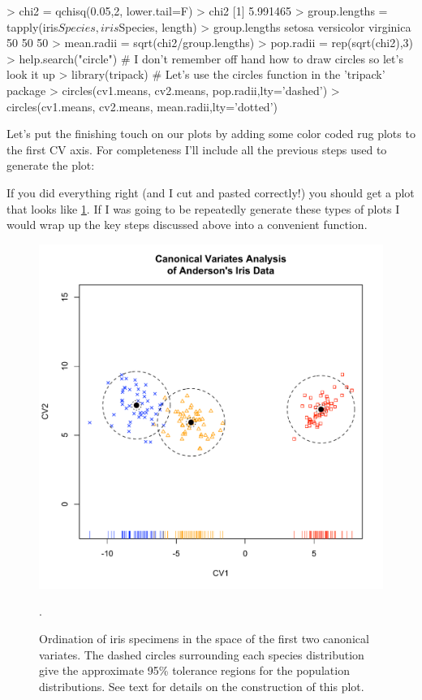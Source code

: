 \begin{R}
> chi2 = qchisq(0.05,2, lower.tail=F)
> chi2
[1] 5.991465
> group.lengths = tapply(iris$Species, iris$Species, length)
> group.lengths
    setosa versicolor  virginica
        50         50         50
> mean.radii = sqrt(chi2/group.lengths)
> pop.radii = rep(sqrt(chi2),3)
> help.search("circle")  # I don't remember off hand how to draw circles so let's look it up
> library(tripack) # Let's use the circles function in the 'tripack' package
> circles(cv1.means, cv2.means, pop.radii,lty='dashed')
> circles(cv1.means, cv2.means, mean.radii,lty='dotted')
\end{R}

Let's put the finishing touch on our plots by adding some color coded rug plots to the first CV axis. For completeness I'll include all the previous steps used to generate the plot:



If you did everything right (and I cut and pasted correctly!) you should get a plot that looks like \cref{fig:cva}.  If I was going to be repeatedly generate these types of plots I would wrap up the key steps discussed above into a convenient function.


\begin{figure}
\begin{center}
\includegraphics[height=0.5\columnwidth]{iris-cva-fancy}
\end{center}
\caption{Ordination of iris specimens in the space of the first two canonical variates.  The dashed circles surrounding each species distribution give the approximate 95\% tolerance regions for the population distributions. See text for details on the construction of this plot.} \label{fig:cva}.
\end{figure}

